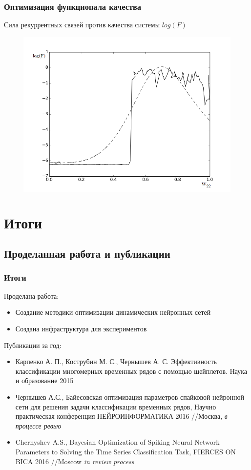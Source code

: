 \documentclass{beamer}
\begin{document}
\begin{frame}
\frametitle{Оптимизация функционала качества}
Сила рекуррентных связей против качества системы $log(F)$
\begin{figure}
   \includegraphics[scale=0.25]{rec_weights_fig.png}
\end{figure}
\end{frame}


\section{Итоги}
\subsection{Проделанная работа и публикации}
\begin{frame}
\frametitle{Итоги}
Проделана работа:
\begin{itemize}
\item Создание методики оптимизации динамических нейронных сетей
\item Создана инфраструктура для экспериментов
\end{itemize}
Публикации за год:
\begin{itemize}
\item {\scriptsize Карпенко А. П., Кострубин М. С., Чернышев А. С. Эффективность классификации многомерных временных рядов с помощью шейплетов. Наука и образование 2015 }
\item {\scriptsize Чернышев А.С., Байесовская оптимизация параметров спайковой нейронной сети для решения задачи классификации временных рядов,  Научно практическая конференция НЕЙРОИНФОРМАТИКА 2016 //Москва, \textit{в процессе ревью} } 
\item {\scriptsize  Chernyshev A.S., Bayesian Optimization of Spiking Neural
Network Parameters to Solving the Time Series
Classification Task, FIERCES ON BICA 2016 //Moscow \textit{in review process} }
\end{itemize}
\end{frame}
\end{document}
